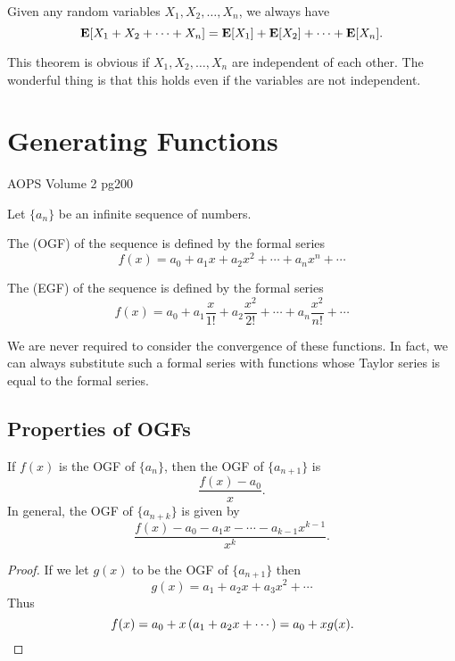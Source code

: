 \begin{theorem}
Given any random variables $X_1,X_2,\dots,X_n$, we always have
\begin{equation}
\mathbf E[X_1+X_2+\cdots+X_n]=\mathbf E[X_1]+\mathbf E[X_2]+\cdots+\mathbf E[X_n].
\end{equation}
\end{theorem}

This theorem is obvious if $X_1,X_2,\dots,X_n$ are independent of each other. The wonderful thing is that this holds even if the variables are not independent.


\pagebreak

\section{Generating Functions}
AOPS Volume 2 pg200

Let $\{a_n\}$ be an infinite sequence of numbers.

The  (OGF) of the sequence is defined by the formal series
\begin{equation}
f(x)=a_0+a_1x+a_2x^2+\cdots+a_nx^n+\cdots
\end{equation}

The  (EGF) of the sequence is defined by the formal series
\begin{equation}
f(x)=a_0+a_1\frac{x}{1!}+a_2\frac{x^2}{2!}+\cdots+a_n\frac{x^2}{n!}+\cdots
\end{equation}

We are never required to consider the convergence of these functions. In fact, we can always substitute such a formal series with functions whose Taylor series is equal to the formal series.

\subsection{Properties of OGFs}
\begin{proposition}
If $f(x)$ is the OGF of $\{a_n\}$, then the OGF of $\{a_{n+1}\}$ is
\[ \frac{f(x)-a_0}{x}. \]
In general, the OGF of $\{a_{n+k}\}$ is given by
\[ \frac{f(x)-a_0-a_1x-\cdots-a_{k-1}x^{k-1}}{x^k}. \]
\end{proposition}

\begin{proof}
If we let $g(x)$ to be the OGF of $\{a_{n+1}\}$ then
\[ g(x)=a_1+a_2x+a_3x^2+\cdots \]
Thus
\[ f(x)=a_0+x\left(a_1+a_2x+\cdots\right)=a_0+xg(x). \]
\end{proof}

